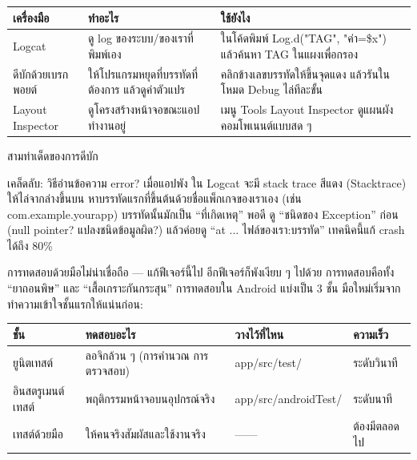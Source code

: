 


\begin{center}
\begin{tabularx}{\linewidth}{|X|X|X|}
\hline
\textbf{เครื่องมือ} & \textbf{ทำอะไร} & \textbf{ใช้ยังไง} \tabularnewline
\hline
Logcat & ดู log ของระบบ/ของเราที่พิมพ์เอง & ในโค้ดพิมพ์ Log.d("TAG", "ค่า=\$x") แล้วค้นหา TAG ในแผงเพื่อกรอง \tabularnewline
ดีบักด้วยเบรกพอยต์ & ให้โปรแกรมหยุดที่บรรทัดที่ต้องการ แล้วดูค่าตัวแปร & คลิกข้างเลขบรรทัดให้ขึ้นจุดแดง แล้วรันในโหมด Debug ไล่ทีละขั้น \tabularnewline
Layout Inspector & ดูโครงสร้างหน้าจอขณะแอปทำงานอยู่ & เมนู Tools Layout Inspector ดูแผนผังคอมโพเนนต์แบบสด ๆ \tabularnewline
\hline
\end{tabularx}
\end{center}

\begin{center}\small\color{gray}สามท่าเด็ดของการดีบัก\end{center}

\begin{tcbinfo}{เคล็ดลับ: วิธีอ่านข้อความ error?}
เมื่อแอปพัง ใน Logcat จะมี stack trace สีแดง (Stacktrace) ให้ไล่จากล่างขึ้นบน หาบรรทัดแรกที่ขึ้นต้นด้วยชื่อแพ็กเกจของเราเอง (เช่น com.example.yourapp) บรรทัดนั้นมักเป็น “ที่เกิดเหตุ” พอดี ดู “ชนิดของ Exception” ก่อน (null pointer? แปลงชนิดข้อมูลผิด?) แล้วค่อยดู “at ... ไฟล์ของเรา:บรรทัด” เทคนิคนี้แก้ crash ได้ถึง 80\%

\end{tcbinfo}


การทดสอบด้วยมือไม่น่าเชื่อถือ — แก้ฟีเจอร์นี้ไป อีกฟีเจอร์ก็พังเงียบ ๆ ไปด้วย การทดสอบคือทั้ง “ยาถอนพิษ” และ “เสื้อเกราะกันกระสุน” การทดสอบใน Android แบ่งเป็น 3 ชั้น มือใหม่เริ่มจากทำความเข้าใจชั้นแรกให้แน่นก่อน:

\begin{center}
\begin{tabularx}{\linewidth}{|X|X|X|X|}
\hline
\textbf{ชั้น} & \textbf{ทดสอบอะไร} & \textbf{วางไว้ที่ไหน} & \textbf{ความเร็ว} \tabularnewline
\hline
ยูนิตเทสต์ & ลอจิกล้วน ๆ (การคำนวณ การตรวจสอบ) & app/src/test/ & ระดับวินาที \tabularnewline
อินสตรูเมนต์เทสต์ & พฤติกรรมหน้าจอบนอุปกรณ์จริง & app/src/androidTest/ & ระดับนาที \tabularnewline
เทสต์ด้วยมือ & ให้คนจริงสัมผัสและใช้งานจริง & —— & ต้องมีตลอดไป \tabularnewline
\hline
\end{tabularx}
\end{center}

